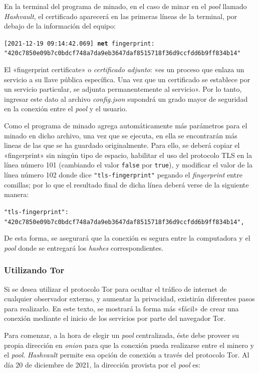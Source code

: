 \documentclass[12pt,a4paper,twoside]{book}
\begin{document}
En la terminal del programa de minado, en el caso de minar en el \textit{pool} llamado \textit{Hashvault}, el certificado aparecerá en las primeras líneas de la terminal, por debajo de la información del equipo:

{\tiny \texttt{[2021-12-19 09:14:42.069] \textbf{net} fingerprint: "420c7850e09b7c0bdcf748a7da9eb3647daf8515718f36d9ccfdd6b9ff834b14"}}

El «fingerprint certificate» o \textit{certificado adjunto}: «es un proceso que enlaza un servicio a su llave pública específica. Una vez que un certificado se establece por un servicio particular, se adjunta permanentemente al servicio». \cite{tls} Por lo tanto, ingresar este dato al archivo \textit{config.json} supondrá un grado mayor de seguridad en la conexión entre el \textit{pool} y el usuario.

Como el programa de minado agrega automáticamente más parámetros para el minado en dicho archivo, una vez que se ejecuta, en ella se encontrarán más lineas de las que se ha guardado originalmente. Para ello, se deberá copiar el «fingerprint» sin ningún tipo de espacio, habilitar el uso del protocolo TLS en la línea número 101 (cambiando el valor \texttt{false} por \texttt{true}), y modificar el valor de la línea número 102 donde dice \texttt{"tls-fingerprint"} pegando el \textit{fingerprint} entre comillas; por lo que el resultado final de dicha línea deberá verse de la siguiente manera:

\begin{scriptsize}
\texttt{"tls-fingerprint": "420c7850e09b7c0bdcf748a7da9eb3647daf8515718f36d9ccfdd6b9ff834b14",}
\end{scriptsize}

De esta forma, se asegurará que la conexión es segura entre la computadora y el \textit{pool} donde se entregará los \textit{hashes} correspondientes.

\subsubsection{Utilizando Tor}
Si se desea utilizar el protocolo Tor para ocultar el tráfico de internet de cualquier observador externo, y aumentar la privacidad, existirán diferentes pasos para realizarlo. En este texto, se mostrará la forma más «fácil» de crear una conexión mediante el inicio de los servicios por parte del navegador Tor.

Para comenzar, a la hora de elegir un \textit{pool} centralizada, éste debe proveer su propia dirección en \textit{onion} para que la conexión pueda realizarse entre el minero y el \textit{pool}. \textit{Hashvault} permite esa opción de conexión a través del protocolo Tor. Al día 20 de diciembre de 2021, la dirección provista por el \textit{pool} es:
\end{document}
